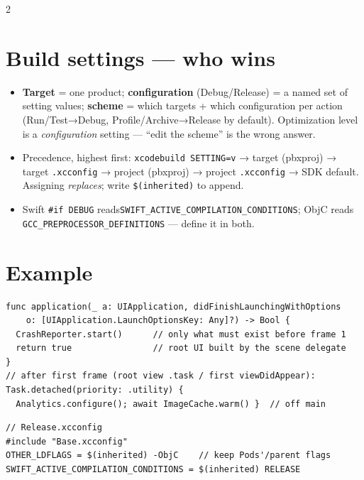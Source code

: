 \documentclass[8pt]{extarticle}
\begin{document}
\begin{multicols}{2}
\section{Build settings — who wins}
\begin{itemize}
  \item \textbf{Target} = one product; \textbf{configuration} (Debug/Release) = a named
        set of setting values; \textbf{scheme} = which targets + which configuration per
        action (Run/Test→Debug, Profile/Archive→Release by default\unverified). Optimization level
        is a \emph{configuration} setting — ``edit the scheme'' is the wrong answer.
  \item Precedence, highest first: \texttt{xcodebuild SETTING=v} → target (pbxproj) →
        target \texttt{.xcconfig} → project (pbxproj) → project \texttt{.xcconfig} → SDK
        default. Assigning \emph{replaces}; write \texttt{\$(inherited)} to append.
  \item Swift \texttt{\#if DEBUG} reads\newline\texttt{SWIFT\_ACTIVE\_COMPILATION\_CONDITIONS};
        ObjC reads \texttt{GCC\_PREPROCESSOR\_DEFINITIONS} — define it in both.
\end{itemize}

\columnbreak

\section{Example}
\begin{lstlisting}[language=SwiftSheet]
func application(_ a: UIApplication, didFinishLaunchingWithOptions
    o: [UIApplication.LaunchOptionsKey: Any]?) -> Bool {
  CrashReporter.start()      // only what must exist before frame 1
  return true                // root UI built by the scene delegate
}
// after first frame (root view .task / first viewDidAppear):
Task.detached(priority: .utility) {
  Analytics.configure(); await ImageCache.warm() }  // off main
\end{lstlisting}
\begin{lstlisting}[style=plain]
// Release.xcconfig
#include "Base.xcconfig"
OTHER_LDFLAGS = $(inherited) -ObjC    // keep Pods'/parent flags
SWIFT_ACTIVE_COMPILATION_CONDITIONS = $(inherited) RELEASE
\end{lstlisting}


\end{multicols}
\end{document}
